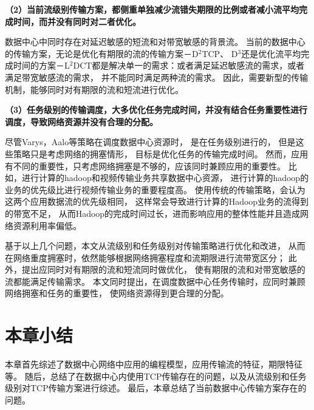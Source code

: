 \textbf{（2）当前流级别传输方案，都侧重单独减少流错失期限的比例或者减小流平均完成时间，而并没有同时对二者优化。}

数据中心中同时存在对延迟敏感的短流和对带宽敏感的背景流。
当前的数据中心的传输方案，无论是优化有期限的流的传输方案－D$^2$TCP、
D$^3$还是优化流平均完成时间的方案－L$^2$DCT都是解决单一的需求：或者满足延迟敏感流的需求，或者满足带宽敏感流的需求，
并不能同时满足两种流的需求。
因此，需要新型的传输机制，能够同时对有期限的流和短流进行优化。

\textbf{（3）任务级别的传输调度，大多优化任务完成时间，并没有结合任务重要性进行调度，导致网络资源并没有合理的分配。}

尽管Varys，Aalo等策略在调度数据中心资源时，
是在任务级别进行的，
但是这些策略只是考虑网络的拥塞情形，
目标是优化任务的传输完成时间。
然而，应用有不同的重要性，只考虑网络拥塞是不够的，应该同时兼顾应用的重要性。
比如，进行计算的hadoop和视频传输业务共享数据中心资源，
进行计算的hadoop的业务的优先级比进行视频传输业务的重要程度高。
使用传统的传输策略，会认为这两个应用数据流的优先级相同，
这样常会导致进行计算的Hadoop业务的流得到的带宽不足，
从而Hadoop的完成时间过长，进而影响应用的整体性能并且造成网络资源利用率偏低。

基于以上几个问题，本文从流级别和任务级别对传输策略进行优化和改进，
从而在网络重度拥塞时，依然能够根据网络拥塞程度和流期限进行流带宽区分；
此外，提出应同时对有期限的流和短流同时做优化，
使有期限的流和对带宽敏感的流都能满足传输需求。
本文同时提出，在调度数据中心任务传输时，应同时兼顾网络拥塞和任务的重要性，
使网络资源得到更合理的分配。

\section{本章小结}
本章首先综述了数据中心网络中应用的编程模型，应用传输流的特征，期限特征等。
随后，总结了在数据中心内使用TCP传输存在的问题，以及从流级别和任务级别对TCP传输方案进行综述。
最后，本章总结了当前数据中心传输方案存在的问题。














